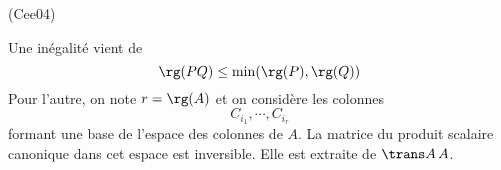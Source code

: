 \begin{tiny}(Cee04)\end{tiny} Une inégalité vient de 
\begin{displaymath}
  \rg(P Q)\leq \min(\rg(P), \rg(Q))
\end{displaymath}
Pour l'autre, on note $r=\rg(A)$ et on considère les colonnes 
\begin{displaymath}
  C_{i_1},\cdots, C_{i_r}
\end{displaymath}
formant une base de l'espace des colonnes de $A$. La matrice du produit scalaire canonique dans cet espace est inversible. Elle est extraite de $\trans A\, A$. 
